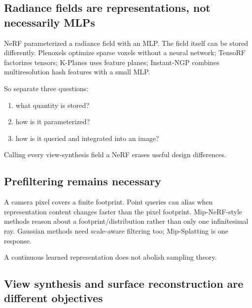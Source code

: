 \subsection{Radiance fields are representations, not necessarily MLPs}\label{04-visual-computing-ii-ch035-radiance-fields-are-representations-not-necessarily-mlps}

\hypertarget{04-visual-computing-ii-ch035-radiance-fields-are-representations-not-necessarily-mlps}{}

NeRF parameterized a radiance field with an MLP. The field itself can be stored differently. Plenoxels optimize sparse voxels without a neural network; TensoRF factorizes tensors; K-Planes uses feature planes; Instant-NGP combines multiresolution hash features with a small MLP.

So separate three questions:

\begin{enumerate}
\def\labelenumi{\arabic{enumi}.}
\tightlist
\item
  what quantity is stored?
\item
  how is it parameterized?
\item
  how is it queried and integrated into an image?
\end{enumerate}

Calling every view-synthesis field a NeRF erases useful design differences.

\subsection{Prefiltering remains necessary}\label{04-visual-computing-ii-ch035-prefiltering-remains-necessary}

\hypertarget{04-visual-computing-ii-ch035-prefiltering-remains-necessary}{}

A camera pixel covers a finite footprint. Point queries can alias when representation content changes faster than the pixel footprint. Mip-NeRF-style methods reason about a footprint/distribution rather than only one infinitesimal ray. Gaussian methods need scale-aware filtering too; Mip-Splatting is one response.

A continuous learned representation does not abolish sampling theory.

\subsection{View synthesis and surface reconstruction are different objectives}\label{04-visual-computing-ii-ch035-view-synthesis-and-surface-reconstruction-are-different-objectives}

